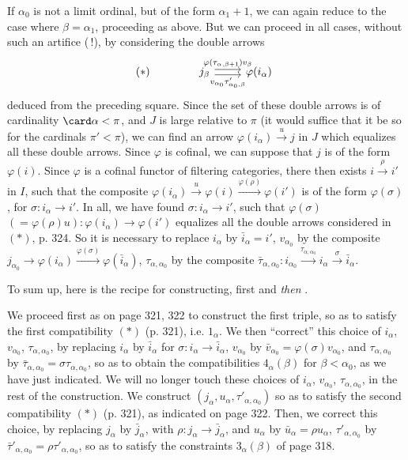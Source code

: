 If $\alpha_0$ is not a limit ordinal, but of the form $\alpha_1+1$, we can again reduce to the case where $\beta=\alpha_1$, proceeding as above. But we can proceed in all cases, without such an artifice (\,!), by considering the double arrows
\[
(*)\qquad\qquad
\begin{tikzcd}
j_\beta \arrow[r, shift left, "\varphi(\tau_{\alpha,\beta+1})v_\beta"] \arrow[r, shift right, "v_{\alpha_0}\tau'_{\alpha_0,\beta}"'] & \varphi(i_\alpha)
\end{tikzcd}
\]
deduced from the preceding square. Since
the set of these double arrows is of cardinality $\card\alpha<\pi$, and $J$ is large relative to $\pi$ (it would suffice that it be so for the cardinals $\pi'<\pi$), we can find an arrow $\varphi(i_\alpha)\xrightarrow{u}j$ in $J$ which equalizes all these double arrows. Since $\varphi$ is cofinal, we can suppose that $j$ is of the form $\varphi(i)$. Since $\varphi$ is a cofinal functor of filtering categories, there then exists $i\xrightarrow{\rho}i'$ in $I$, such that the composite $\varphi(i_\alpha)\xrightarrow{u}\varphi(i)\xrightarrow{\varphi(\rho)}\varphi(i')$ is of the form $\varphi(\sigma)$, for $\sigma:i_\alpha\longrightarrow i'$. In all, we have found $\sigma:i_\alpha\longrightarrow i'$, such that $\varphi(\sigma)$ $(=\varphi(\rho)u):\varphi(i_\alpha)\longrightarrow\varphi(i')$ equalizes all the double arrows considered in $(*)$, p. 324. So it is necessary to replace $i_\alpha$ by $\bar{i}_\alpha=i'$, $v_{\alpha_0}$ by the composite $j_{\alpha_0}\longrightarrow\varphi(i_\alpha)\xrightarrow{\varphi(\sigma)}\varphi(\bar{i}_\alpha)$, $\tau_{\alpha,\alpha_0}$
by the composite $\bar{\tau}_{\alpha,\alpha_0}:i_{\alpha_0}\xrightarrow{\tau_{\alpha,\alpha_0}}i_\alpha\xrightarrow{\sigma}\bar{i}_\alpha$.

To sum up, here is the recipe for constructing, first and \textit{then} .

We proceed first as on page 321, 322 to construct the first triple, so as to satisfy the first compatibility $(*)$ (p. 321), i.e. $1_\alpha$. We then ``correct'' this choice of $i_\alpha$, $v_{\alpha_0}$, $\tau_{\alpha,\alpha_0}$, by replacing $i_\alpha$ by $\bar{i}_\alpha$ for $\sigma:i_\alpha\longrightarrow\bar{i}_\alpha$, $v_{\alpha_0}$ by $\bar{v}_{\alpha_0}=\varphi(\sigma)v_{\alpha_0}$, and $\tau_{\alpha,\alpha_0}$ by $\bar{\tau}_{\alpha,\alpha_0}=\sigma\tau_{\alpha,\alpha_0}$, so as to obtain the compatibilities $4_\alpha(\beta)$ for $\beta<\alpha_0$, as we have just indicated. We will no longer touch these choices of $i_\alpha$, $v_{\alpha_0}$, $\tau_{\alpha,\alpha_0}$, in the rest of the construction. We construct $(j_\alpha,u_\alpha,\tau'_{\alpha,\alpha_0})$ so as to satisfy the second compatibility $(*)$ (p. 321), as
indicated on page 322. Then, we correct this choice, by replacing $j_\alpha$ by $\bar{j}_\alpha$, with $\rho:j_\alpha\longrightarrow\bar{j}_\alpha$, and $u_\alpha$ by $\bar{u}_\alpha=\rho u_\alpha$, $\tau'_{\alpha,\alpha_0}$ by $\bar{\tau}'_{\alpha,\alpha_0}=\rho\tau'_{\alpha,\alpha_0}$, so as to satisfy the constraints $3_\alpha(\beta)$ of page 318.


